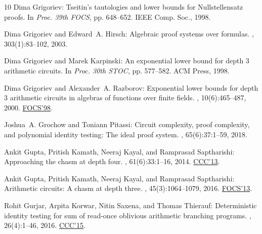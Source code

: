 \documentclass[11pt]{article}
\numberwithin{equation}{section}
\theoremstyle{definition}
\theoremstyle{plain}
\begin{document}
\begin{thebibliography}{10}
{\sc Dima Grigoriev}: {T}seitin's tautologies and lower bounds for
  {N}ullstellensatz proofs.
\newblock In {\em Proc. 39th FOCS}, pp. 648--652. IEEE Comp. Soc., 1998.

{\sc Dima Grigoriev and Edward~A. Hirsch}: Algebraic proof systems over
  formulas.
, 303(1):83--102, 2003.

{\sc Dima Grigoriev and Marek Karpinski}: An exponential lower bound for depth
  3 arithmetic circuits.
\newblock In {\em Proc. 30th STOC}, pp. 577--582. ACM Press, 1998.
\newblock [\epfmtdoi{10.1145/276698.276872}]

{\sc Dima Grigoriev and Alexander~A. Razborov}: Exponential lower bounds for
  depth 3 arithmetic circuits in algebras of functions over finite fields.
, 10(6):465--487, 2000.
\newblock \prelim \href{https://doi.org/10.1109/SFCS.1998.743456}{FOCS'98}.
\newblock [\epfmtdoi{10.1007/s002009900021}]

{\sc Joshua~A. Grochow and Toniann Pitassi}: Circuit complexity, proof
  complexity, and polynomial identity testing: The ideal proof system.
, 65(6):37:1--59, 2018.
\newblock [\epfmtdoi{10.1145/3230742}]

{\sc Ankit Gupta, Pritish Kamath, Neeraj Kayal, and Ramprasad Saptharishi}:
  Approaching the chasm at depth four.
, 61(6):33:1--16, 2014.
\newblock \prelim \href{http://doi.org/10.1109/CCC.2013.16}{CCC'13}.
\newblock [\epfmtdoi{10.1145/2629541}]

{\sc Ankit Gupta, Pritish Kamath, Neeraj Kayal, and Ramprasad Saptharishi}:
  Arithmetic circuits: A chasm at depth three.
, 45(3):1064--1079, 2016.
\newblock \prelim \href{https://doi.org/10.1109/FOCS.2013.68}{FOCS'13}.

{\sc Rohit Gurjar, Arpita Korwar, Nitin Saxena, and Thomas Thierauf}:
  Deterministic identity testing for sum of read-once oblivious arithmetic
  branching programs.
, 26(4):1--46, 2016.
\newblock \prelim \href{https://doi.org/10.4230/LIPIcs.CCC.2015.323}{CCC'15}.


\end{thebibliography}
\end{document}
